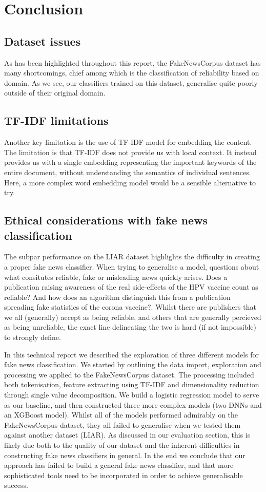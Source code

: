 \section{Conclusion}

\subsection{Dataset issues}
As has been highlighted throughout this report, the FakeNewsCorpus dataset has many shortcomings, chief among which is
the classification of reliability based on domain. As we see, our classifiers trained on this dataset, generalise quite
poorly outside of their original domain.

\subsection{TF-IDF limitations}
Another key limitation is the use of TF-IDF model for embedding the content. The limitation is that TF-IDF does
not provide us with local context. It instead provides us with a single embedding representing the important keywords of the
entire document, without understanding the semantics of individual sentences. Here, a more complex word embedding model
would be a sensible alternative to try.

\subsection{Ethical considerations with fake news classification}
The subpar performance on the LIAR dataset highlights the difficulty in creating a proper fake news classifier. When trying to
generalise a model, questions about what consitutes reliable, fake or misleading news quickly arises. Does a publication raising awareness
of the real side-effects of the HPV vaccine count as reliable? And how does an algorithm distinguish this from a
publication spreading fake statistics of the corona vaccine?. Whilst there are publishers that we all (generally)
accept as being reliable, and others that are generally percieved as being unreliable, the exact line delineating the
two is hard (if not impossible) to strongly define.


In this technical report we described the exploration of three different models for fake news classification. We started
by outlining the data import, exploration and processing we applied to the FakeNewsCorpus dataset. The processing
included both tokenisation, feature extracting using TF-IDF and dimensionality reduction through single value
decomposition. We build a logistic regression model to serve as our baseline, and then constructed three more complex
models (two DNNs and an XGBoost model). Whilst all of the models performed admirably on the FakeNewsCorpus dataset, they
all failed to generalise when we tested them against another dataset (LIAR). As discussed in our evaluation section,
this is likely due both to the quality of our dataset and the inherent difficulties in constructing fake news
classifiers in general. In the end we conclude that our approach has failed to build a general fake news classifier, and
that more sophisticated tools need to be incorporated in order to achieve generalisable success.

